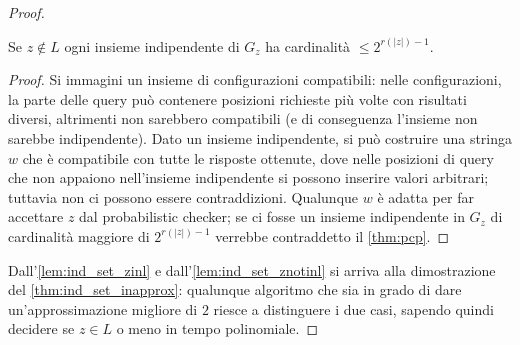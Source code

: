\begin{proof}
\begin{oss}
	Se $z \notin L$ ogni insieme indipendente di $G_z$ ha cardinalità
	$\leq 2^{r(|z|)-1}$.
\end{oss}
\begin{proof}
    Si immagini un insieme di configurazioni compatibili: nelle configurazioni, la parte delle query può contenere 
    posizioni richieste più volte con risultati diversi, altrimenti non sarebbero compatibili (e di conseguenza 
    l'insieme non sarebbe indipendente). Dato un insieme indipendente, si può costruire una stringa $w$ che è 
    compatibile con tutte le risposte ottenute, dove nelle posizioni di query che non appaiono nell'insieme 
    indipendente si possono inserire valori arbitrari; tuttavia non ci possono essere contraddizioni. 
    Qualunque $w$ è adatta per far accettare $z$ dal probabilistic checker; se ci fosse un insieme indipendente 
    in $G_z$ di cardinalità maggiore di $2^{r(|z|) -1}$ verrebbe contraddetto il \cref{thm:pcp}. 
\end{proof}
Dall'\cref{lem:ind_set_zinl} e dall'\cref{lem:ind_set_znotinl} si arriva alla dimostrazione del \cref{thm:ind_set_inapprox}: 
qualunque algoritmo che sia in grado di dare un'approssimazione migliore di $2$ riesce a distinguere i due casi, 
sapendo quindi decidere se $z \in L$ o meno in tempo polinomiale.
\end{proof}

